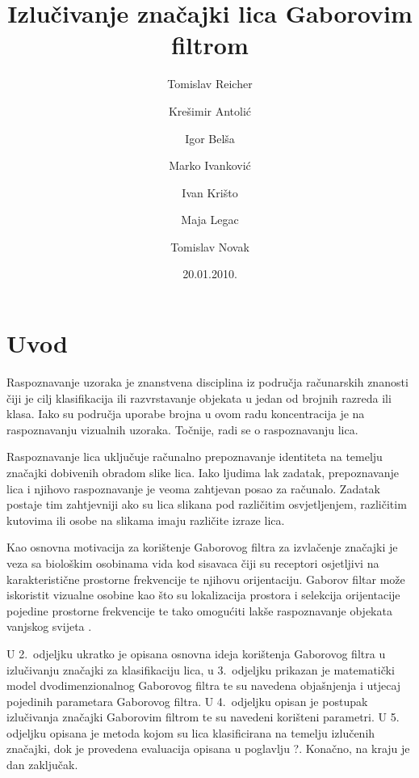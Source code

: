 \documentclass{ru}
\begin{document}
\title{Izlučivanje značajki lica Gaborovim filtrom}
\author{Tomislav Reicher \and Krešimir Antolić \and Igor Belša \and Marko Ivanković \and Ivan Krišto \and Maja Legac \and Tomislav Novak}
\date{20.01.2010.}
\maketitle

\newpage

\tableofcontents

\chapter{Uvod}
Raspoznavanje uzoraka je znanstvena disciplina iz područja računarskih znanosti
čiji je cilj klasifikacija ili razvrstavanje objekata u jedan od brojnih razreda
ili klasa. Iako su područja uporabe brojna u ovom radu koncentracija je na
raspoznavanju vizualnih uzoraka. Točnije, radi se o raspoznavanju lica.

Raspoznavanje lica uključuje računalno prepoznavanje identiteta na temelju
značajki dobivenih obradom slike lica. Iako ljudima lak zadatak, prepoznavanje
lica i njihovo raspoznavanje je veoma zahtjevan posao za računalo. Zadatak
postaje tim zahtjevniji ako su lica slikana pod različitim osvjetljenjem,
različitim kutovima ili osobe na slikama imaju različite izraze lica.

Kao osnovna motivacija za korištenje Gaborovog filtra za izvlačenje značajki je
veza sa biološkim osobinama vida kod sisavaca čiji su receptori osjetljivi na
karakteristične prostorne frekvencije te njihovu orijentaciju. Gaborov filtar
može iskoristit vizualne osobine kao što su lokalizacija prostora i selekcija
orijentacije pojedine prostorne frekvencije te tako omogućiti lakše
raspoznavanje objekata vanjskog svijeta
\citep{bhuiyan2007onfacerecognition}\nocite{daugman1985uncertainty}.

U 2.~odjeljku ukratko je opisana osnovna ideja korištenja Gaborovog
filtra u izlučivanju značajki za klasifikaciju lica, u 3.~odjeljku prikazan je
matematički model dvodimenzionalnog Gaborovog filtra te su navedena objašnjenja
i utjecaj pojedinih parametara Gaborovog filtra. U 4.~odjeljku opisan je
postupak izlučivanja značajki Gaborovim filtrom te su navedeni korišteni
parametri. U 5. odjeljku opisana je metoda kojom su lica klasificirana na temelju
izlučenih značajki, dok je provedena evaluacija opisana u poglavlju ?. Konačno, na
kraju je dan zaključak.
\end{document}
